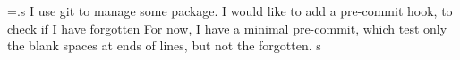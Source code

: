 \documentclass[a4paper, oneside, notitlepage, 12pt]{article}
\begin{document}
 \newcommand*{\do@line}{%
  {\vbadness=10000
   \splittopskip=\z@
   \do@linehook
\l@demptyd@ta
   \global\setbox\one@line=\vsplit\raw@text to\baselineskip}%
  \unvbox\one@line \global\setbox\one@line=\lastbox
  \getline@num
  \IfStrEq{\led@pb@setting}{before}{\led@check@pb\led@check@nopb}{}
  \ifnum\@lock>\@ne
    \inserthangingsymboltrue
  \else
    \inserthangingsymbolfalse
  \fi
  \check@pb@in@verse
  \affixline@num
  \affixpstart@num
  \numdef{\tmp}{\c@pstart}%
  \ifnumequal{1}{\tmp}{\csuse{lsection@\tmp}}{
  \hb@xt@ \linewidth{\do@insidelinehook\l@dld@ta\add@inserts\affixside@note
    \l@dlsn@te
    {\ledllfill\hb@xt@ \wd\one@line{\new@line\inserthangingsymbol \l@dunhbox@line{\one@line}}\ledrlfill\l@drd@ta%
    \l@drsn@te
  }}}
  \IfStrEq{\led@pb@setting}{after}{\led@check@pb\led@check@nopb}{}
  }%
\def\led@section#1#2{\global\csdef{ledsection@#2}{\section{#1}}}

\beginnumbering
\immediate\openout\ledsec@out=\jobname.s
\pstart
{}
\pend
\pstart
I use git to manage some package.
I would like to add a pre-commit hook, to check if I have forgotten
For now, I have a minimal pre-commit, which test only the blank spaces at ends of lines, but not the forgotten.
\pend
\pstart
s
\pend
  \immediate\closeout\ledsec@out

\endnumbering
\end{document}
